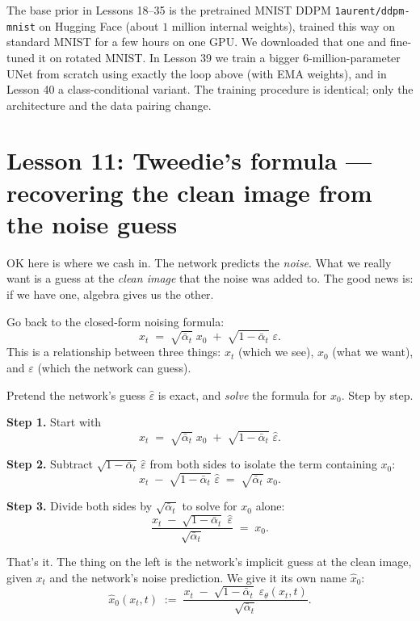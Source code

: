 \documentclass[11pt]{article}
\begin{document}
\begin{aside}
The base prior in Lessons 18--35 is the pretrained MNIST DDPM
\texttt{1aurent/ddpm-mnist} on Hugging Face (about $1$ million internal
weights), trained this way on standard MNIST for a few hours on one GPU.
We downloaded that one and fine-tuned it on rotated MNIST. In Lesson 39
we train a bigger $6$-million-parameter UNet from scratch using exactly
the loop above (with EMA weights), and in Lesson 40 a class-conditional
variant. The training procedure is identical; only the architecture and
the data pairing change.
\end{aside}

\section{Lesson 11: Tweedie's formula --- recovering the clean image from the noise guess}

OK here is where we cash in. The network predicts the \emph{noise}.
What we really want is a guess at the \emph{clean image} that the noise
was added to. The good news is: if we have one, algebra gives us the
other.

Go back to the closed-form noising formula:
\[
x_t \;=\; \sqrt{\bar\alpha_t}\;x_0 \;+\; \sqrt{1 - \bar\alpha_t}\;\varepsilon.
\]
This is a relationship between three things: $x_t$ (which we see),
$x_0$ (what we want), and $\varepsilon$ (which the network can guess).

Pretend the network's guess $\hat\varepsilon$ is exact, and \emph{solve}
the formula for $x_0$. Step by step.

\textbf{Step 1.} Start with
\[
x_t \;=\; \sqrt{\bar\alpha_t}\;x_0 \;+\; \sqrt{1 - \bar\alpha_t}\;\hat\varepsilon.
\]

\textbf{Step 2.} Subtract $\sqrt{1 - \bar\alpha_t}\,\hat\varepsilon$ from
both sides to isolate the term containing $x_0$:
\[
x_t \;-\; \sqrt{1 - \bar\alpha_t}\;\hat\varepsilon
\;=\; \sqrt{\bar\alpha_t}\;x_0.
\]

\textbf{Step 3.} Divide both sides by $\sqrt{\bar\alpha_t}$ to solve
for $x_0$ alone:
\[
\frac{x_t \;-\; \sqrt{1 - \bar\alpha_t}\;\hat\varepsilon}{\sqrt{\bar\alpha_t}}
\;=\; x_0.
\]

That's it. The thing on the left is the network's implicit guess at
the clean image, given $x_t$ and the network's noise prediction. We
give it its own name $\hat x_0$:
\[
\boxed{\;\; \hat x_0(x_t, t) \;:=\;
\frac{x_t \;-\; \sqrt{1 - \bar\alpha_t}\;\varepsilon_\theta(x_t, t)}{\sqrt{\bar\alpha_t}}. \;\;}
\]
\end{document}
